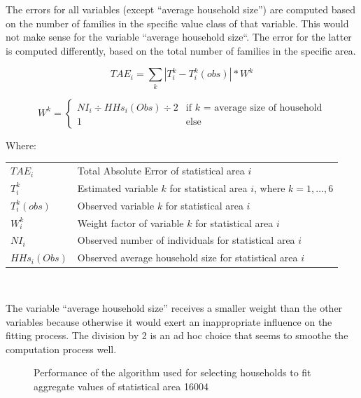 \documentclass[11pt]{IJM-article}
\begin{document}
The errors for all variables (except ``average household size'') are computed
based on the number of families in the specific value class of that variable.
This would not make sense for the variable ``average household size``. The
error for the latter is computed differently, based on the total number of
families in the specific area.\\

\parbox{\textwidth}{
    \begin{equation} 
        \label{eq:1} 
        TAE_i = \sum_{k} |T_i^{k} - T_i^{k}(obs)| * W^k 
    \end{equation} 
    
    \begin{equation} 
        \label{eq:2} 
        W^k = \begin{cases} 
            NI_{i} \div HHs_{i}(Obs) \div 2 & \text{if $k$ = average size of
                household} \\ 
            1 & \text{else} 
        \end{cases} 
    \end{equation} 

    \noindent Where:\\
    \begin{tabular}{lp{15cm}} 
        $TAE_i$ & Total Absolute Error of statistical area $i$ \\ 
        $T_i^{k}$ & Estimated variable $k$ for statistical area $i$, 
            where $k = 1, \dots , 6$ \\ 
        $T_i^{k}(obs)$ & Observed variable $k$ for statistical area $i$ \\ 
        $W_i^k$ & Weight factor of variable $k$ for statistical area $i$\\
        $NI_{i}$ & Observed number of individuals for statistical area $i$ \\
        $HHs_{i}(Obs)$ & Observed average household size for statistical 
            area $i$ \\
    \end{tabular} 
}\\
\pb

The variable ``average household size'' receives a smaller weight than the other
variables because otherwise it would exert an inappropriate influence on the
fitting process. The division by 2 is an ad hoc choice that seems to smoothe
the computation process well.\\

\begin{figure}[htb]
    \caption{
        Performance of the algorithm used for selecting households to fit
    aggregate values of statistical area 16004} 
    \label{fig:4}
    \centering 
    
\end{figure}
\end{document}
